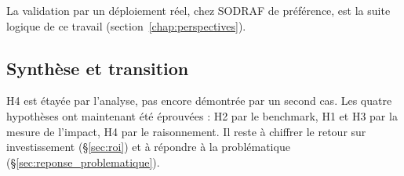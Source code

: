La validation par un déploiement réel, chez SODRAF de préférence, est la suite logique de ce travail (section~\ref{chap:perspectives}).

\subsection{Synthèse et transition}
\label{sec:spl_synthese_transition}

H4 est étayée par l'analyse, pas encore démontrée par un second cas. Les quatre hypothèses ont maintenant été éprouvées : H2 par le benchmark, H1 et H3 par la mesure de l'impact, H4 par le raisonnement. Il reste à chiffrer le retour sur investissement (\S\ref{sec:roi}) et à répondre à la problématique (\S\ref{sec:reponse_problematique}).
